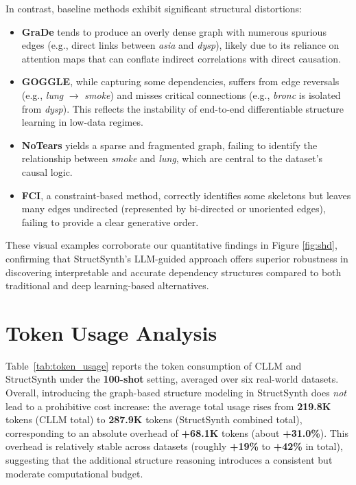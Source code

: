 In contrast, baseline methods exhibit significant structural distortions:
\begin{itemize}[leftmargin=*]
    \item \textbf{GraDe} tends to produce an overly dense graph with numerous spurious edges (e.g., direct links between \textit{asia} and \textit{dysp}), likely due to its reliance on attention maps that can conflate indirect correlations with direct causation.
    \item \textbf{GOGGLE}, while capturing some dependencies, suffers from edge reversals (e.g., \textit{lung} $\rightarrow$ \textit{smoke}) and misses critical connections (e.g., \textit{bronc} is isolated from \textit{dysp}). This reflects the instability of end-to-end differentiable structure learning in low-data regimes.
    \item \textbf{NoTears} yields a sparse and fragmented graph, failing to identify the relationship between \textit{smoke} and \textit{lung}, which are central to the dataset's causal logic.
    \item \textbf{FCI}, a constraint-based method, correctly identifies some skeletons but leaves many edges undirected (represented by bi-directed or unoriented edges), failing to provide a clear generative order.
\end{itemize}

These visual examples corroborate our quantitative findings in Figure \ref{fig:shd}, confirming that \textsf{StructSynth}'s LLM-guided approach offers superior robustness in discovering interpretable and accurate dependency structures compared to both traditional and deep learning-based alternatives.



\section{Token Usage Analysis}
\label{sec:token_usage}

Table~\ref{tab:token_usage} reports the token consumption of \textsc{CLLM} and \textsf{StructSynth} under the \textbf{100-shot} setting, averaged over six real-world datasets. Overall, introducing the graph-based structure modeling in \textsf{StructSynth} does \emph{not} lead to a prohibitive cost increase: the average total usage rises from \textbf{219.8K} tokens (\textsc{CLLM} total) to \textbf{287.9K} tokens (\textsf{StructSynth} combined total), corresponding to an absolute overhead of \textbf{+68.1K} tokens (about \textbf{+31.0\%}). This overhead is relatively stable across datasets (roughly \textbf{+19\%} to \textbf{+42\%} in total), suggesting that the additional structure reasoning introduces a consistent but moderate computational budget.

